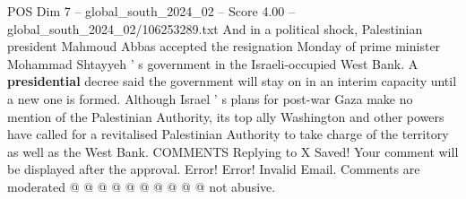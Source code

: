 \begin{textsample}{POS Dim 7 – global\_south\_2024\_02 – Score 4.00 – global\_south\_2024\_02/106253289.txt}
And in a political shock, Palestinian president Mahmoud Abbas accepted the resignation Monday of prime minister Mohammad Shtayyeh ' s government in the Israeli-occupied West Bank.
A \textbf{presidential} decree said the government will stay on in an interim capacity until a new one is formed.
Although Israel ' s plans for post-war Gaza make no mention of the Palestinian Authority, its top ally Washington and other powers have called for a revitalised Palestinian Authority to take charge of the territory as well as the West Bank.
COMMENTS Replying to X Saved!
Your comment will be displayed after the approval.
Error!
Error!
Invalid Email.
Comments are moderated @ @ @ @ @ @ @ @ @ @ not abusive.

\end{textsample}
